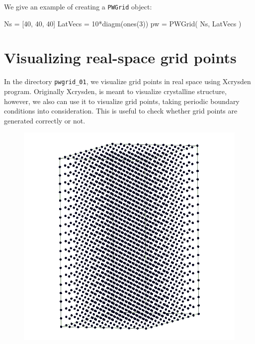 \documentclass[a4paper,11pt]{extarticle}
\begin{document}
We give an example of creating a {\tt PWGrid} object:
\begin{juliacode}
Ns = [40, 40, 40]
LatVecs = 10*diagm(ones(3))
pw = PWGrid( Ns, LatVecs )
\end{juliacode}


\section{Visualizing real-space grid points}

In the directory \verb|pwgrid_01|, we visualize grid points in real space
using Xcrysden program. Originally Xcrysden, is meant to visualize crystalline structure,
however, we also can use it to visualize grid points, taking periodic boundary
conditions into consideration.
This is useful to check whether grid points are generated correctly or not.

\begin{figure}
\centering
\includegraphics[scale=0.25]{images/R_grid_hexagonal.png}
\par
\end{figure}







\end{document}
